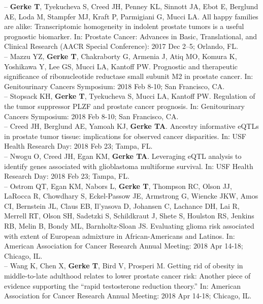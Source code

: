 \documentclass[11pt, a4paper]{article} %
\begin{document}
-- {\bf Gerke T}, Tyekucheva S, Creed JH, Penney KL, Sinnott JA, Ebot E, Berglund AE, Loda M, Stampfer MJ, Kraft P, Parmigiani G, Mucci LA. All happy families are alike: Transcriptomic homogeneity in indolent prostate tumors is a useful prognostic biomarker. In: Prostate Cancer: Advances in Basic, Translational, and Clinical Research (AACR Special Conference): 2017 Dec 2--5; Orlando, FL.\\

-- Mazzu YZ, {\bf Gerke T}, Chakraborty G, Armenia J, Atiq MO, Komura K, Yoshikawa Y, Lee GS, Mucci LA, Kantoff PW. Prognostic and therapeutic significance of ribonucleotide reductase small subunit M2 in prostate cancer. In: Genitourinary Cancers Symposium: 2018 Feb 8-10; San Francisco, CA.\\

-- Stopsack KH, {\bf Gerke T}, Tyekucheva S, Mucci LA, Kantoff PW. Regulation of the tumor suppressor PLZF and prostate cancer prognosis. In: Genitourinary Cancers Symposium: 2018 Feb 8-10; San Francisco, CA.\\

-- Creed JH, Berglund AE, Yamoah KJ, {\bf Gerke TA}. Ancestry informative eQTLs in prostate tumor tissue: implications for observed cancer disparities. In: USF Health Research Day: 2018 Feb 23; Tampa, FL. \\

-- Nwogu O, Creed JH, Egan KM, {\bf Gerke TA}. Leveraging eQTL analysis to identify genes associated with glioblastoma multiforme survival. In: USF Health Research Day: 2018 Feb 23; Tampa, FL. \\

-- Ostrom QT, Egan KM, Nabors L, {\bf Gerke T}, Thompson RC, Olson JJ, LaRocca R, Chowdhary S, Eckel-Passow JE, Armstrong G, Wiencke JKW, Amos CI, Bernstein JL, Claus EB, Il'yasova D, Johansen C, Lachance DH, Lai R, Merrell RT, Olson SH, Sadetzki S, Schildkraut J, Shete S, Houlston RS, Jenkins RB, Melin B, Bondy ML, Barnholtz-Sloan JS. Evaluating glioma risk associated with extent of European admixture in African-Americans and Latinos. In: American Association for Cancer Research Annual Meeting: 2018 Apr 14-18; Chicago, IL.\\

-- Wang K, Chen X, {\bf Gerke T}, Bird V, Prosperi M.  Getting rid of obesity in middle-to-late adulthood relates to lower prostate cancer risk: Another piece of evidence supporting the ``rapid testosterone reduction theory.'' In: American Association for Cancer Research Annual Meeting: 2018 Apr 14-18; Chicago, IL.\\
\end{document}
